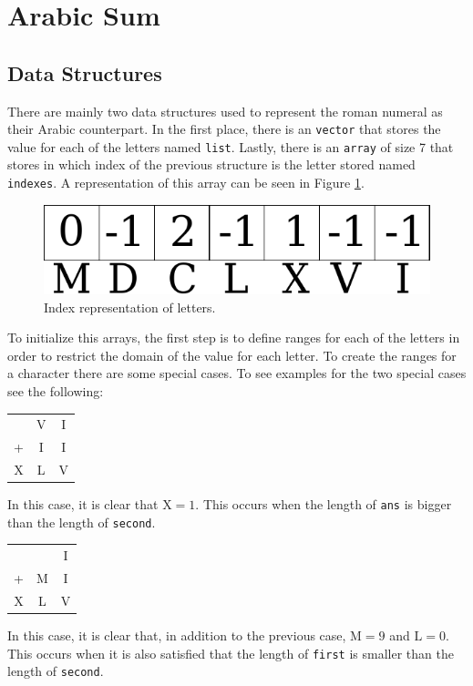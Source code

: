 \documentclass[11pt]{article}
\theoremstyle{definition}
\theoremstyle{remark}
\theoremstyle{remark}
\begin{document}
\section{Arabic Sum}

\subsection{Data Structures}
There are mainly two data structures used to represent the roman numeral as
their Arabic counterpart. In the first place, there is an \texttt{vector} that
stores the value for each of the letters named \texttt{list}. Lastly, there is
an \texttt{array} of size 7 that stores in which index of the previous structure
is the letter stored named \texttt{indexes}. A representation of this array can
be seen in Figure \ref{fig:indRep}.

\begin{figure}[H]
  \centering
  \includegraphics[scale=.5]{figs/index-roman}
  \caption{Index representation of letters.}
  \label{fig:indRep}
\end{figure}

To initialize this arrays, the first step is to define ranges for each of the
letters in order to restrict the domain of the value for each letter. To create
the ranges for a character there are some special cases. To see examples for the
two special cases see the following:

\begin{multicols}{2}
  \noindent
  \begin{table}[H]
    \centering
    \begin{tabular}{ccc}
      & V & I \\
    + & I & I \\ \hline
    X & L & V
    \end{tabular}
  \end{table}
  In this case, it is clear that $\text{X}=1$. This occurs when the length of
  \texttt{ans} is bigger than the length of \texttt{second}.
  \columnbreak
  \begin{table}[H]
    \centering
    \begin{tabular}{ccc}
      &   & I \\
    + & M & I \\ \hline
    X & L & V
    \end{tabular}
  \end{table}
  In this case, it is clear that, in addition to the previous case, $\text{M}=9$
  and $\text{L}=0$. This occurs when it is also satisfied that the length of
  \texttt{first} is smaller than the length of \texttt{second}.
\end{multicols}
\end{document}
